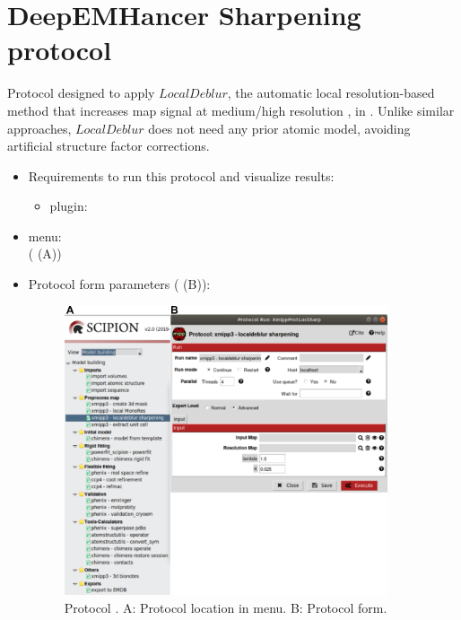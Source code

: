 \section{DeepEMHancer Sharpening protocol}
\label{app:deepEMhancerSharpening}%

Protocol designed to apply $LocalDeblur$, the automatic local resolution-based method that increases map signal at medium/high resolution \citep{ramirez2018}, in \scipion. Unlike similar approaches, $LocalDeblur$ does not need any prior atomic model, avoiding artificial structure factor corrections.

\begin{itemize}
 \item Requirements to run this protocol and visualize results:
    \begin{itemize}
        \item \scipion plugin: 
    \end{itemize}
 \item \scipion menu:\\
   ( (A))
  
 \item Protocol form parameters ( (B)):
  
    \begin{figure}[H]
     \centering 
     \captionsetup{width=.7\linewidth} 
     \includegraphics[width=0.90\textwidth]{Images_appendix/Fig208}
     \caption{Protocol . A: Protocol location in \scipion menu. B: Protocol form.}
     \label{fig:app_localdeblur_1}
    \end{figure}
    

\end{itemize}
